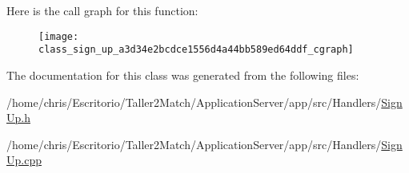 Here is the call graph for this function\+:
\nopagebreak
\begin{figure}[H]
\begin{center}
\leavevmode
\texttt{[image: class\_sign\_up\_a3d34e2bcdce1556d4a44bb589ed64ddf\_cgraph]}
\end{center}
\end{figure}




The documentation for this class was generated from the following files\+:\begin{DoxyCompactItemize}
\item 
/home/chris/\+Escritorio/\+Taller2\+Match/\+Application\+Server/app/src/\+Handlers/\hyperlink{_sign_up_8h}{Sign\+Up.\+h}\item 
/home/chris/\+Escritorio/\+Taller2\+Match/\+Application\+Server/app/src/\+Handlers/\hyperlink{_sign_up_8cpp}{Sign\+Up.\+cpp}\end{DoxyCompactItemize}
